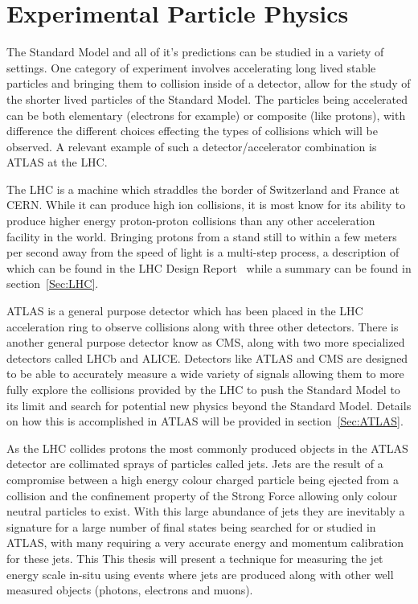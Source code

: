\section{Experimental Particle Physics}
\label{Sec:Experi}
The Standard Model and all of it's predictions can be studied in a variety of settings.  
One category of experiment involves accelerating long lived stable particles and bringing them to collision inside of a detector, allow for the study of the shorter lived particles of the Standard Model.  
The particles being accelerated can be both elementary (electrons for example) or composite (like protons), with difference the different choices effecting the types of collisions which will be observed.  
A relevant example of such a detector/accelerator combination is \gls{ATLAS} at the \gls{LHC}.  

The \gls{LHC} is a machine which straddles the border of Switzerland and France at \gls{CERN}.  
While it can produce high ion collisions, it is most know for its ability to produce higher energy proton-proton collisions than any other acceleration facility in the world.   
Bringing protons from a stand still to within a few meters per second away from the speed of light is a multi-step process, a description of which can be found in the LHC Design Report~\cite{LHCDesignReport} while a summary can be found in section~\ref{Sec:LHC}.  

\gls{ATLAS} is a general purpose detector which has been placed in the LHC acceleration ring to observe collisions along with three other detectors.  
There is another general purpose detector know as \gls{CMS}, along with two more specialized detectors called \gls{LHCb} and \gls{ALICE}.  
Detectors like \gls{ATLAS} and \gls{CMS} are designed to be able to accurately measure a wide variety of signals allowing them to more fully explore the collisions provided by the \gls{LHC} to push the Standard Model to its limit and search for potential new physics beyond the Standard Model.  
Details on how this is accomplished in ATLAS will be provided in section~\ref{Sec:ATLAS}.  

As the \gls{LHC} collides protons the most commonly produced objects in the \gls{ATLAS} detector are collimated sprays of particles called jets.  
Jets are the result of a compromise between a high energy colour charged particle being ejected from a collision and the confinement property of the Strong Force allowing only colour neutral particles to exist.  
With this large abundance of jets they are inevitably a signature for a large number of final states being searched for or studied in ATLAS, with many requiring a very accurate energy and momentum calibration for these jets.  
This This thesis will present a technique for measuring the jet energy scale in-situ using events where jets are produced along with other well measured objects (photons, electrons and muons).  

